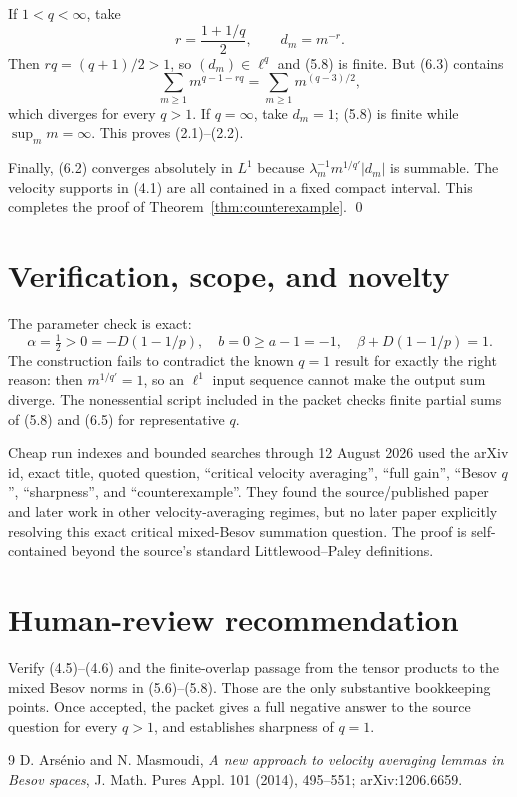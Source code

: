 \documentclass[11pt]{article}
\begin{document}
If $1<q<\infty$, take
\[
 r=\frac{1+1/q}{2},\qquad d_m=m^{-r}.                    \tag{6.4}
\]
Then $rq=(q+1)/2>1$, so $(d_m)\in\ell^q$ and (5.8) is finite.  But (6.3)
contains
\[
 \sum_{m\ge1}m^{q-1-rq}=\sum_{m\ge1}m^{(q-3)/2},         \tag{6.5}
\]
which diverges for every $q>1$.  If $q=\infty$, take $d_m=1$; (5.8) is
finite while $\sup_m m=\infty$.  This proves (2.1)--(2.2).

Finally, (6.2) converges absolutely in $L^1$ because
$\lambda_m^{-1}m^{1/q'}|d_m|$ is summable.  The velocity supports in (4.1)
are all contained in a fixed compact interval.  This completes the proof of
Theorem~\ref{thm:counterexample}. \qed

\section{Verification, scope, and novelty}

The parameter check is exact:
\[
 \alpha=\tfrac12>0=-D(1-1/p),\quad b=0\ge a-1=-1,
 \quad\beta+D(1-1/p)=1.
\]
The construction fails to contradict the known $q=1$ result for exactly the
right reason: then $m^{1/q'}=1$, so an $\ell^1$ input sequence cannot make the
output sum diverge.  The nonessential script included in the packet checks
finite partial sums of (5.8) and (6.5) for representative $q$.

Cheap run indexes and bounded searches through 12 August 2026 used the arXiv
id, exact title, quoted question, ``critical velocity averaging'', ``full
gain'', ``Besov $q$'', ``sharpness'', and ``counterexample''.  They found the
source/published paper and later work in other velocity-averaging regimes,
but no later paper explicitly resolving this exact critical mixed-Besov
summation question.  The proof is self-contained beyond the source's standard
Littlewood--Paley definitions.

\section{Human-review recommendation}

Verify (4.5)--(4.6) and the finite-overlap passage from the tensor products to
the mixed Besov norms in (5.6)--(5.8).  Those are the only substantive
bookkeeping points.  Once accepted, the packet gives a full negative answer
to the source question for every $q>1$, and establishes sharpness of $q=1$.

\begin{thebibliography}{9}
D. Ars\'enio and N. Masmoudi,
\emph{A new approach to velocity averaging lemmas in Besov spaces},
J. Math. Pures Appl. 101 (2014), 495--551; arXiv:1206.6659.
\end{thebibliography}
\end{document}
